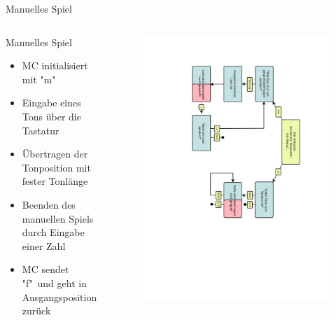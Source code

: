 \begin{frame}{Manuelles Spiel}
\begin{columns}
\column{0.5\paperwidth}
\vspace{-1cm}
\begin{exampleblock}{Manuelles Spiel}
\begin{itemize}
\item MC initialisiert mit "m"
\item Eingabe eines Tons über die Tastatur
\item Übertragen der Tonposition mit fester Tonlänge
\item Beenden des manuellen Spiels durch Eingabe einer Zahl
\item MC sendet "f"\ und geht in Ausgangsposition zurück
\end{itemize}
\end{exampleblock}
\column{0.5\paperwidth}
\begin{figure}
\center
\includegraphics[trim=11cm 18cm 10cm 29cm, clip=true,angle=90, clip=true,height=\textheight]{Plots/Diagramm1.pdf}
\end{figure}
\end{columns}
\end{frame}


